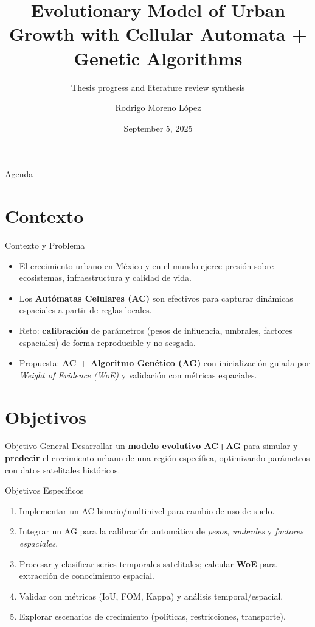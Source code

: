 \documentclass[aspectratio=169]{beamer}
\title[CA + GA for Urban Growth]{Evolutionary Model of Urban Growth with Cellular Automata + Genetic Algorithms}
\subtitle{Thesis progress and literature review synthesis}
\author{Rodrigo Moreno López}
\institute{IIMAS--UNAM}
\date{September 5, 2025}
\begin{document}
\begin{frame}
  \titlepage
\end{frame}

\begin{frame}{Agenda}
  \tableofcontents
\end{frame}

\section{Contexto}
\begin{frame}{Contexto y Problema}
  \begin{itemize}
    \item El crecimiento urbano en México y en el mundo ejerce presión sobre ecosistemas, infraestructura y calidad de vida.
    \item Los \textbf{Autómatas Celulares (AC)} son efectivos para capturar dinámicas espaciales a partir de reglas locales.
    \item Reto: \textbf{calibración} de parámetros (pesos de influencia, umbrales, factores espaciales) de forma reproducible y no sesgada.
    \item Propuesta: \textbf{AC + Algoritmo Genético (AG)} con inicialización guiada por \emph{Weight of Evidence (WoE)} y validación con métricas espaciales.
  \end{itemize}
\end{frame}

\section{Objetivos}
\begin{frame}{Objetivo General}
  \large
  Desarrollar un \textbf{modelo evolutivo AC+AG} para simular y \textbf{predecir} el crecimiento urbano de una región específica, optimizando parámetros con datos satelitales históricos.
\end{frame}

\begin{frame}{Objetivos Específicos}
  \begin{enumerate}
    \item Implementar un AC binario/multinivel para cambio de uso de suelo.
    \item Integrar un AG para la calibración automática de \emph{pesos}, \emph{umbrales} y \emph{factores espaciales}.
    \item Procesar y clasificar series temporales satelitales; calcular \textbf{WoE} para extracción de conocimiento espacial.
    \item Validar con métricas (IoU, FOM, Kappa) y análisis temporal/espacial.
    \item Explorar escenarios de crecimiento (políticas, restricciones, transporte).
  \end{enumerate}
\end{frame}
\end{document}
